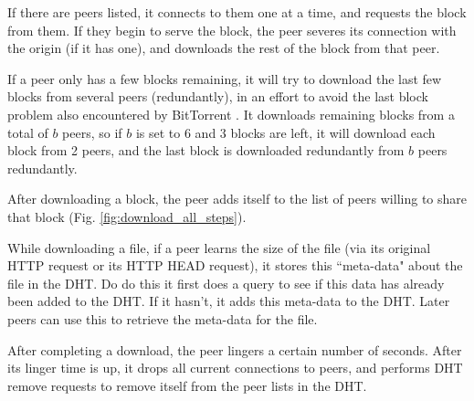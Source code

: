 If there are peers listed, it connects to them one at a time, and requests the block from them.  If they begin to serve the block, the peer severes its connection with the origin (if it has one),
and downloads the rest of the block from that peer.

If a peer only has a few blocks remaining, it will try to download the last few blocks from several peers (redundantly), in an effort to avoid the last block problem also
encountered by BitTorrent \cite{bram}.  It downloads remaining blocks from a total of $b$ peers, so if $b$ is set to 6 and 3 blocks are left, it will download each block from 2 peers, and the
last block is downloaded redundantly from $b$ peers redundantly.

After downloading a block, the peer adds itself to the list of peers willing to share that block (Fig. \ref{fig:download_all_steps}). 

While downloading a file, if a peer learns the size of the file (via its original HTTP request or its HTTP HEAD request), it stores this ``meta-data" about the file
in the DHT.  Do do this it first does a query to see if this data has already been added to the DHT.  If it hasn't, it adds this meta-data to the DHT.  Later peers
can use this to retrieve the meta-data for the file.

After completing a download, the peer lingers a certain number of seconds.  After its linger time is up, it drops all current connections to peers, and performs DHT remove requests to
remove itself from the peer lists in the DHT.

